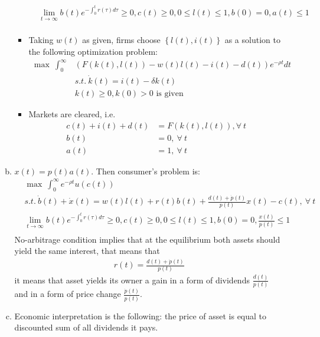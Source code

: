 \documentclass[a4paper]{article}
\begin{document}
\begin{enumerate}[1.]
\begin{enumerate}[(a)]
\begin{itemize}
\begin{align*}
			&\lim_{t \to \infty} b(t)e^{-\int_{0}^t r(\tau)d\tau} \ge 0, c(t) \ge 0, 0 \le l(t) \le 1, b(0) = 0, a(t) \le 1\\
			\end{align*}
			\item Taking $w(t)$ as given, firms choose $\left\{l(t), i(t)\right\}$ as a solution to the following optimization problem:
			\begin{align*}
			\max\ \int_{0}^{\infty} &(F(k(t), l(t)) - w(t)l(t) - i(t) - d(t))e^{-\rho t}dt\\
			&s.t.\ \dot{k}(t) = i(t) - \delta k(t)\\
			&k(t) \ge 0, k(0) > 0 \text{ is given}
			\end{align*}
			\item Markets are cleared, i.e.
			\begin{align*}
			c(t) + i(t) + d(t)&= F(k(t), l(t)), \forall\ t\\
			b(t) &= 0,\ \forall\ t\\
			a(t) &= 1,\ \forall\ t
			\end{align*}
		\end{itemize}
	\item $x(t) = p(t)a(t)$. Then consumer's problem is:
	\begin{align*}
	&\max\ \int_{0}^{\infty} e^{-\rho t}u(c(t))\\
	&s.t.\ \dot{b}(t) + \dot{x}(t) = w(t)l(t) + r(t)b(t) + \frac{d(t) + \dot{p}(t)}{p(t)}x(t) - c(t),\ \forall\ t\\
	&\lim_{t \to \infty} b(t)e^{-\int_{0}^t r(\tau)d\tau} \ge 0, c(t) \ge 0, 0 \le l(t) \le 1, b(0) = 0, \frac{x(t)}{p(t)} \le 1\\
	\end{align*}
	No-arbitrage condition implies that at the equilibrium both assets should yield the same interest, that means that
	\begin{align*}
	r(t) = \frac{d(t) + \dot{p}(t)}{p(t)}
	\end{align*}
	it means that asset yields its owner a gain in a form of dividends $\frac{d(t)}{p(t)}$ and in a form of price change $\frac{\dot{p}(t)}{p(t)}$.
	\item Economic interpretation is the following: the price of asset is equal to discounted sum of all dividends it pays.
	\end{enumerate}
\end{enumerate}
\end{document}
